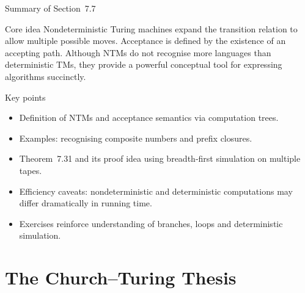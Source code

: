 \begin{frame}[t]{Summary of Section 7.7}
  \begin{tblock}{Core idea}
    Nondeterministic Turing machines expand the transition relation to
    allow multiple possible moves.  Acceptance is defined by the
    existence of an accepting path.  Although NTMs do not recognise
    more languages than deterministic TMs, they provide a powerful
    conceptual tool for expressing algorithms succinctly.
  \end{tblock}
  \begin{tblock}{Key points}
    \begin{itemize}
      \item Definition of NTMs and acceptance semantics via
        computation trees.
      \item Examples: recognising composite numbers and prefix closures.
      \item Theorem 7.31 and its proof idea using breadth‑first
        simulation on multiple tapes.
      \item Efficiency caveats: nondeterministic and deterministic
        computations may differ dramatically in running time.
      \item Exercises reinforce understanding of branches, loops and
        deterministic simulation.
    \end{itemize}
  \end{tblock}
  \label{fr:7.7-15}
\end{frame}

%

\section{The Church–Turing Thesis}

